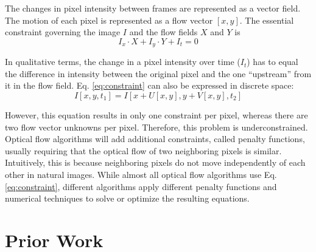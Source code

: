 \documentclass[10pt,twocolumn,letterpaper]{article}
\begin{document}
The changes in pixel intensity between frames are represented as a vector field. The motion of each pixel is represented as a flow vector $[x, y]$. The essential constraint governing the image $I$ and the flow fields $X$ and $Y$ is
\begin{equation} \label{eq:constraint}
I_x \cdot X+ I_y \cdot Y + I_t = 0
\end{equation}


In qualitative terms, the change in a pixel intensity over time ($I_t$) has to equal the difference in intensity between the original pixel and the one “upstream” from it in the flow field. Eq. \ref{eq:constraint} can also be expressed in discrete space:
\begin{equation} \label{eq:discrete}
I[x, y, t_1] = I[x + U[x, y], y + V[x, y], t_2]
\end{equation}

However, this equation results in only one constraint per pixel, whereas there are two flow vector unknowns per pixel. Therefore, this problem is underconstrained. \cite{wu} Optical flow algorithms will add additional constraints, called penalty functions, usually requiring that the optical flow of two neighboring pixels is similar.  Intuitively, this is because neighboring pixels do not move independently of each other in natural images. While almost all optical flow algorithms use Eq. \ref{eq:constraint}, different algorithms apply different penalty functions and numerical techniques to solve or optimize the resulting equations.

\section{Prior Work}
\end{document}

